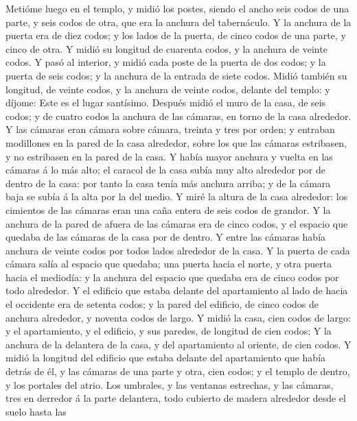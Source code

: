  Metióme luego en el templo, y midió los postes, siendo el
ancho seis codos de una parte, y seis codos de otra, que era la anchura
del tabernáculo.  Y la anchura de la puerta era de diez
codos; y los lados de la puerta, de cinco codos de una parte, y cinco de
otra. Y midió su longitud de cuarenta codos, y la anchura de veinte
codos.  Y pasó al interior, y midió cada poste de la puerta
de dos codos; y la puerta de seis codos; y la anchura de la entrada de
siete codos.  Midió también su longitud, de veinte codos, y
la anchura de veinte codos, delante del templo: y díjome: Este es el
lugar santísimo.  Después midió el muro de la casa, de seis
codos; y de cuatro codos la anchura de las cámaras, en torno de la casa
alrededor.  Y las cámaras eran cámara sobre cámara, treinta
y tres por orden; y entraban modillones en la pared de la casa
alrededor, sobre los que las cámaras estribasen, y no estribasen en la
pared de la casa.  Y había mayor anchura y vuelta en las
cámaras á lo más alto; el caracol de la casa subía muy alto alrededor
por de dentro de la casa: por tanto la casa tenía más anchura arriba; y
de la cámara baja se subía á la alta por la del medio.  Y
miré la altura de la casa alrededor: los cimientos de las cámaras eran
una caña entera de seis codos de grandor.  Y la anchura de
la pared de afuera de las cámaras era de cinco codos, y el espacio que
quedaba de las cámaras de la casa por de dentro.  Y entre
las cámaras había anchura de veinte codos por todos lados alrededor de
la casa.  Y la puerta de cada cámara salía al espacio que
quedaba; una puerta hacia el norte, y otra puerta hacia el mediodía: y
la anchura del espacio que quedaba era de cinco codos por todo
alrededor.  Y el edificio que estaba delante del
apartamiento al lado de hacia el occidente era de setenta codos; y la
pared del edificio, de cinco codos de anchura alrededor, y noventa codos
de largo.  Y midió la casa, cien codos de largo: y el
apartamiento, y el edificio, y sus paredes, de longitud de cien codos;
 Y la anchura de la delantera de la casa, y del
apartamiento al oriente, de cien codos.  Y midió la
longitud del edificio que estaba delante del apartamiento que había
detrás de él, y las cámaras de una parte y otra, cien codos; y el templo
de dentro, y los portales del atrio.  Los umbrales, y las
ventanas estrechas, y las cámaras, tres en derredor á la parte
delantera, todo cubierto de madera alrededor desde el suelo hasta las
